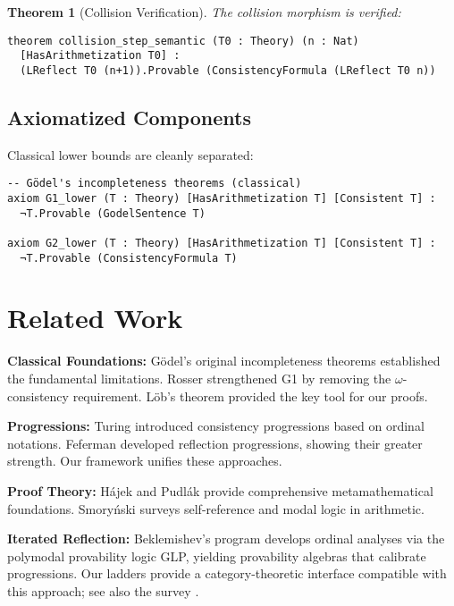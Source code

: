 \documentclass[11pt]{article}
\newtheorem{theorem}{Theorem}[section]
\begin{document}
\begin{theorem}[Collision Verification]
The collision morphism is verified:
\begin{lstlisting}[language=Lean]
theorem collision_step_semantic (T0 : Theory) (n : Nat)
  [HasArithmetization T0] :
  (LReflect T0 (n+1)).Provable (ConsistencyFormula (LReflect T0 n))
\end{lstlisting}
\end{theorem}

\subsection{Axiomatized Components}

Classical lower bounds are cleanly separated:

\begin{lstlisting}[language=Lean]
-- Gödel's incompleteness theorems (classical)
axiom G1_lower (T : Theory) [HasArithmetization T] [Consistent T] :
  ¬T.Provable (GodelSentence T)

axiom G2_lower (T : Theory) [HasArithmetization T] [Consistent T] :
  ¬T.Provable (ConsistencyFormula T)
\end{lstlisting}

\section{Related Work}

\textbf{Classical Foundations:} Gödel's original incompleteness theorems \cite{Godel1931} established the fundamental limitations. Rosser \cite{Rosser1936} strengthened G1 by removing the $\omega$-consistency requirement. Löb's theorem \cite{Lob1955} provided the key tool for our proofs.

\textbf{Progressions:} Turing \cite{Turing1939} introduced consistency progressions based on ordinal notations. Feferman \cite{Feferman1962} developed reflection progressions, showing their greater strength. Our framework unifies these approaches.

\textbf{Proof Theory:} Hájek and Pudlák \cite{HajekPudlak} provide comprehensive metamathematical foundations. Smoryński \cite{Smorynski1985} surveys self-reference and modal logic in arithmetic.

\textbf{Iterated Reflection:} Beklemishev's program \cite{Beklemishev2003,Beklemishev2004} develops ordinal analyses via the polymodal provability logic GLP, yielding provability algebras that calibrate progressions. Our ladders provide a category-theoretic interface compatible with this approach; see also the survey \cite{ArtemovBeklemishev2004}.
\end{document}

